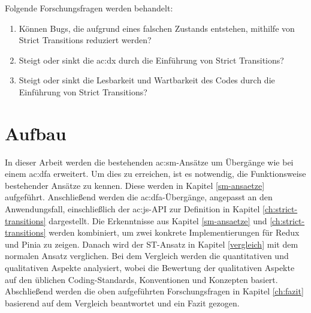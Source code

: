 Folgende Forschungsfragen werden behandelt:

\begin{enumerate}
  \item Können Bugs, die aufgrund eines falschen Zustands entstehen, mithilfe von Strict Transitions reduziert werden?
  \item Steigt oder sinkt die \acrshort{ac:dx} durch die Einführung von Strict Transitions?
  \item Steigt oder sinkt die Lesbarkeit und Wartbarkeit des Codes durch die Einführung von Strict Transitions?
\end{enumerate}

\section{Aufbau}

In dieser Arbeit werden die bestehenden \acrshort{ac:sm}-Ansätze um Übergänge wie bei einem \acrshort{ac:dfa} erweitert. Um dies zu erreichen, ist es notwendig, die Funktionsweise bestehender Ansätze zu kennen. Diese werden in Kapitel \ref{sm-ansaetze} aufgeführt. Anschließend werden die \acrshort{ac:dfa}-Übergänge, angepasst an den Anwendungsfall, einschließlich der \acrlong{ac:js}-API zur Definition in Kapitel \ref{ch:strict-transitions} dargestellt. Die Erkenntnisse aus Kapitel \ref{sm-ansaetze} und \ref{ch:strict-transitions} werden kombiniert, um zwei konkrete Implementierungen für Redux und Pinia zu zeigen. Danach wird der ST-Ansatz in Kapitel \ref{vergleich} mit dem normalen Ansatz verglichen. Bei dem Vergleich werden die quantitativen und qualitativen Aspekte analysiert, wobei die Bewertung der qualitativen Aspekte auf den üblichen Coding-Standards, Konventionen und Konzepten basiert. Abschließend werden die oben aufgeführten Forschungsfragen in Kapitel \ref{ch:fazit} basierend auf dem Vergleich beantwortet und ein Fazit gezogen.
